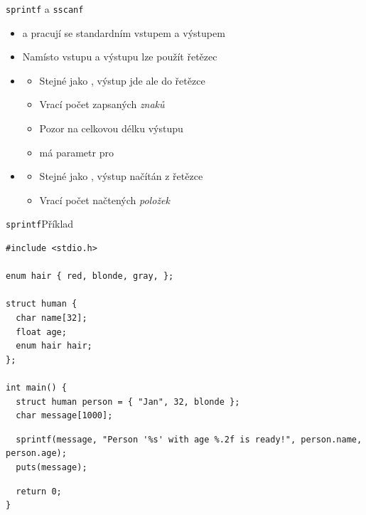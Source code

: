 \begin{frame}[fragile]{\texttt{sprintf} a \texttt{sscanf}}

  \begin{itemize}
    \item {} a  pracují se standardním vstupem a výstupem

    \pause

    \item Namísto vstupu a výstupu lze použít řetězec

    \pause

    \item {}
    \begin{itemize}
      \item Stejné jako , výstup jde ale do řetězce 
      \item Vrací počet zapsaných \emph{znaků}
      \item Pozor na celkovou délku výstupu

      \pause

      \item {} má parametr  pro 
    \end{itemize}

    \pause

    \item {}
    \begin{itemize}
      \item Stejné jako , výstup načítán z řetězce 
      \item Vrací počet načtených \emph{položek}
    \end{itemize}

  \end{itemize}

\end{frame}

\begin{frame}[fragile]{\texttt{sprintf}}{Příklad}

\begin{lstlisting}
#include <stdio.h>

enum hair { red, blonde, gray, };

struct human {
  char name[32];
  float age;
  enum hair hair;
};

int main() {
  struct human person = { "Jan", 32, blonde };
  char message[1000];
\end{lstlisting}


\begin{lstlisting}
  sprintf(message, "Person '%s' with age %.2f is ready!", person.name, person.age);
  puts(message);
\end{lstlisting}

\begin{lstlisting}
  return 0;
}
\end{lstlisting}

\end{frame}

